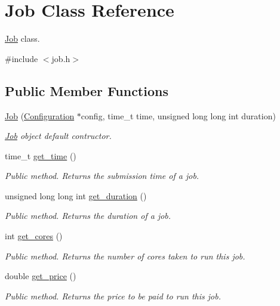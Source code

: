 \hypertarget{classJob}{}\section{Job Class Reference}
\label{classJob}


\hyperlink{classJob}{Job} class.  




{\ttfamily \#include $<$job.\+h$>$}

\subsection*{Public Member Functions}
\begin{DoxyCompactItemize}
\item 
\hyperlink{classJob_aa876f2c96653d4b4749359444c653546}{Job} (\hyperlink{classConfiguration}{Configuration} $\ast$config, time\+\_\+t time, unsigned long long int duration)
\begin{DoxyCompactList}\small\item\em \hyperlink{classJob}{Job} object default contructor. \end{DoxyCompactList}\item 
time\+\_\+t \hyperlink{classJob_a3a9d5b907691c1a5f3e3b7dae9434232}{get\+\_\+time} ()
\begin{DoxyCompactList}\small\item\em Public method. Returns the submission time of a job. \end{DoxyCompactList}\item 
unsigned long long int \hyperlink{classJob_ada2d6b6ad399dd2a5d9677770bc31dd2}{get\+\_\+duration} ()
\begin{DoxyCompactList}\small\item\em Public method. Returns the duration of a job. \end{DoxyCompactList}\item 
int \hyperlink{classJob_a1983414eca65855ad4b60016d8f4732d}{get\+\_\+cores} ()
\begin{DoxyCompactList}\small\item\em Public method. Returns the number of cores taken to run this job. \end{DoxyCompactList}\item 
double \hyperlink{classJob_ae1623b448348b01c5b2216e59789a3bf}{get\+\_\+price} ()
\begin{DoxyCompactList}\small\item\em Public method. Returns the price to be paid to run this job. \end{DoxyCompactList}\item 

\end{DoxyCompactItemize}
